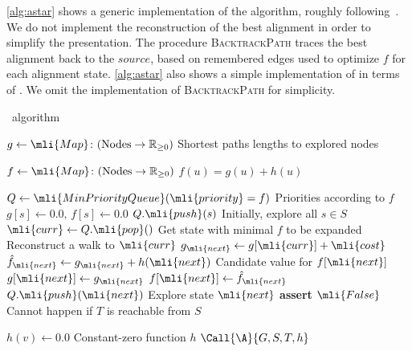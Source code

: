 \cref{alg:astar} shows a generic implementation of the \A algorithm,
roughly following~\cite{dechter_generalized_1985}.
We do not implement the reconstruction of the best alignment in order to simplify the presentation.
The procedure \mbox{\textsc{BacktrackPath}} traces the best alignment back to the $source$, based on remembered edges used to optimize $f$ for each alignment state.
%
\cref{alg:astar} also shows a simple implementation of \dijkstra in terms of \A.
We omit the implementation of \textsc{BacktrackPath} for simplicity.

\begin{algorithm}[H]
	\caption{\A~algorithm} \label{alg:astar}
	\begin{algorithmic}[1]
		\State $g \gets \mli{Map}\colon (\text{Nodes} \to \mathbb{R}_{\geq 0})$
		\Comment Shortest paths lengths to explored nodes

		\State $f \gets \mli{Map}\colon (\text{Nodes} \to \mathbb{R}_{\geq 0})$
		\Comment $f(u)=g(u)+h(u)$ 

		\State $Q \gets \mli{MinPriorityQueue}(\mli{priority}=f)$ 
		\Comment Priorities according to $f$
			\State $g[s] \gets 0.0,\, f[s] \gets 0.0$
			\State $Q.\mli{push}(s)$
			\Comment Initially, explore all $s \in S$
		\EndFor
			\State $\mli{curr} \gets Q.\mli{pop}()$
			\Comment Get state with minimal $f$ to be expanded
				\State \Return {}
				\Comment Reconstruct a walk to $\mli{curr}$
			\EndIf
			\State $g_\mli{next} \gets g[\mli{curr}] + \mli{cost}$
			\State $\hat{f}_\mli{next} \gets g_\mli{next} + h(\mli{next})$
				\Comment Candidate value for $f[\mli{next}]$
					\State $g[\mli{next}] \gets g_\mli{next}$		
					\State $f[\mli{next}] \gets \hat{f}_\mli{next}$		
					\State $Q.\mli{push}(\mli{next})$
					\Comment Explore state $\mli{next}$
				\EndIf
		\EndFor
		\EndWhile
		\State \textbf{assert} $\mli{False}$
		\Comment Cannot happen if $T$ is reachable from $S$
		\EndFunction

		\Statex

			\State $h(v) \gets 0.0$
			\Comment Constant-zero function $h$
			\State $\Call{\A}{G,S,T,h}$
		\EndFunction
	\end{algorithmic}
\end{algorithm}

